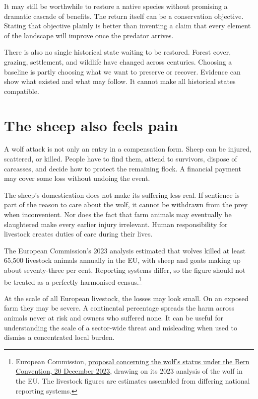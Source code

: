 \documentclass[12pt,a4paper]{book}
\begin{document}
It may still be worthwhile to restore a native species without promising a dramatic cascade of benefits. The return itself can be a conservation objective. Stating that objective plainly is better than inventing a claim that every element of the landscape will improve once the predator arrives.

There is also no single historical state waiting to be restored. Forest cover, grazing, settlement, and wildlife have changed across centuries. Choosing a baseline is partly choosing what we want to preserve or recover. Evidence can show what existed and what may follow. It cannot make all historical states compatible.

\section*{The sheep also feels pain}

A wolf attack is not only an entry in a compensation form. Sheep can be injured, scattered, or killed. People have to find them, attend to survivors, dispose of carcasses, and decide how to protect the remaining flock. A financial payment may cover some loss without undoing the event.

The sheep's domestication does not make its suffering less real. If sentience is part of the reason to care about the wolf, it cannot be withdrawn from the prey when inconvenient. Nor does the fact that farm animals may eventually be slaughtered make every earlier injury irrelevant. Human responsibility for livestock creates duties of care during their lives.

The European Commission's 2023 analysis estimated that wolves killed at least 65,500 livestock animals annually in the EU, with sheep and goats making up about seventy-three per cent. Reporting systems differ, so the figure should not be treated as a perfectly harmonised census.\footnote{European Commission, \href{https://environment.ec.europa.eu/system/files/2023-12/Council\%20Decision\%20-\%20wildlife\%20and\%20natural\%20habitats.pdf}{proposal concerning the wolf's status under the Bern Convention, 20 December 2023}, drawing on its 2023 analysis of the wolf in the EU. The livestock figures are estimates assembled from differing national reporting systems.}

At the scale of all European livestock, the losses may look small. On an exposed farm they may be severe. A continental percentage spreads the harm across animals never at risk and owners who suffered none. It can be useful for understanding the scale of a sector-wide threat and misleading when used to dismiss a concentrated local burden.
\end{document}
